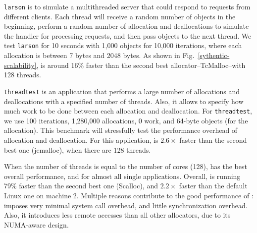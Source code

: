  \texttt{larson} is to simulate a multithreaded server that could respond to requests from different clients. Each thread  will receive a random number of objects in the beginning, perform a random number of allocation and deallocations to simulate the handler for processing requests, and then pass objects to the next thread. We test \texttt{larson} for 10 seconds with 1,000 objects for 10,000 iterations, where each allocation is between 7 bytes and 2048 bytes. As shown in Fig.~\ref{sythentic-scalability}, \NM{} is around 16\% faster than the second best allocator--TcMalloc--with 128 threads.   


\texttt{threadtest} is an application that performs a large number of allocations and deallocations with a specified number of threads. Also, it allows to specify how much work to be done between each allocation and deallocation. For \texttt{threadtest}, we use 100 iterations, 1,280,000 allocations, 0 work, and 64-byte objects (for the allocation).  This benchmark will stressfully test the performance overhead of allocation and deallocation. For this application, \NM{} is $2.6\times$ faster than the second best one (jemalloc), when there are 128 threads. %


When the number of threads is equal to the number of cores (128), \NM{} has the best overall performance, and for almost all single applications. Overall, \NM{} is running 79\% faster than the second best one (Scalloc), and $2.2\times$ faster than the default Linux one on machine 2.  Multiple reasons contribute to the good performance of \NM{}:  \NM{} imposes very minimal system call overhead, and little synchronization overhead. Also, it introduces less remote accesses than all other allocators, due to its NUMA-aware design. 




